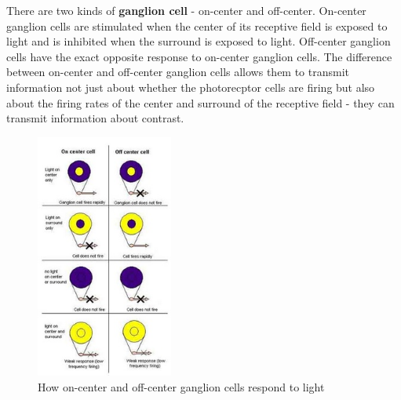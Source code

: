 \documentclass{article}
\begin{document}
	\par There are two kinds of \textbf{ganglion cell} - on-center and off-center. On-center ganglion cells are stimulated when the center of its receptive field is exposed to light and is inhibited when the surround is exposed to light. Off-center ganglion cells have the exact opposite response to on-center ganglion cells. The difference between on-center and off-center ganglion cells allows them to transmit information not just about whether the photorecptor cells are firing but also about the firing rates of the center and surround of the receptive field - they can transmit information about contrast.
	
	\begin{figure}[ht]
		\centering
		\includegraphics[width=0.4\textwidth]{on_off_ganglion_cells}
		\caption{How on-center and off-center ganglion cells respond to light}
		\label{fig:on off ganglion}
	\end{figure}
	
\end{document}
